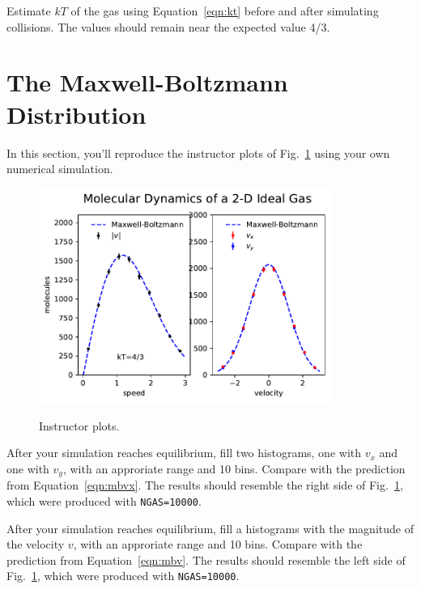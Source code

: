 \begin{plot} Estimate $kT$ of the gas using Equation~\ref{eqn:kt} before and after simulating collisions.
The values should remain near the expected value 4/3.
\end{plot}

\section{The Maxwell-Boltzmann Distribution}

In this section, you'll reproduce the instructor plots of Fig.~\ref{fig:mbinst} using your own numerical simulation.

\begin{figure}[htbp]
\begin{center}
\includegraphics[width=0.85\textwidth]{figs/maxwellboltzman/maxboltz-instr.pdf} \\
\caption{Instructor plots.}
\label{fig:mbinst}
\end{center}
\end{figure}

\begin{plot}
  After your simulation reaches equilibrium, fill two histograms, one with $v_x$ and one with $v_y$, with an approriate range and 10 bins.  Compare with the prediction from Equation~\ref{eqn:mbvx}.  The results should resemble the right side of Fig.~\ref{fig:mbinst}, which were produced with {\tt NGAS=10000}.
\end{plot}

\begin{plot}
  After your simulation reaches equilibrium, fill a histograms with the magnitude of the velocity $v$, with an approriate range and 10 bins.  Compare with the prediction from Equation~\ref{eqn:mbv}.  The results should resemble the left side of Fig.~\ref{fig:mbinst}, which were produced with {\tt NGAS=10000}.
\end{plot}


  

